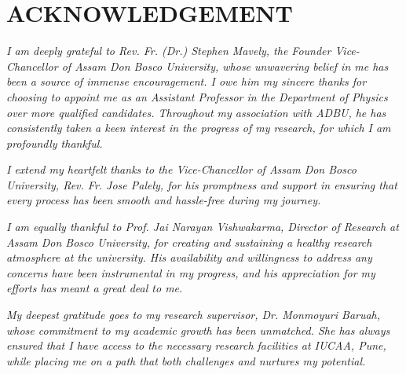 \pagestyle{empty}

\chapter*{ACKNOWLEDGEMENT}
    \def\baselinestretch{1.0}
    
    
    \par\textsl{I am deeply grateful to Rev. Fr. (Dr.) Stephen Mavely, the Founder Vice-Chancellor of Assam Don Bosco University, whose unwavering belief in me has been a source of immense encouragement. I owe him my sincere thanks for choosing to appoint me as an Assistant Professor in the Department of Physics over more qualified candidates. Throughout my association with ADBU, he has consistently taken a keen interest in the progress of my research, for which I am profoundly thankful.}
    
    \par\textsl{I extend my heartfelt thanks to the Vice-Chancellor of Assam Don Bosco University, Rev. Fr. Jose Palely, for his promptness and support in ensuring that every process has been smooth and hassle-free during my journey.}
    
    \par\textsl{I am equally thankful to Prof. Jai Narayan Vishwakarma, Director of Research at Assam Don Bosco University, for creating and sustaining a healthy research atmosphere at the university. His availability and willingness to address any concerns have been instrumental in my progress, and his appreciation for my efforts has meant a great deal to me.}
    
    \par\textsl{My deepest gratitude goes to my research supervisor, Dr. Monmoyuri Baruah, whose commitment to my academic growth has been unmatched. She has always ensured that I have access to the necessary research facilities at IUCAA, Pune, while placing me on a path that both challenges and nurtures my potential.}
    
